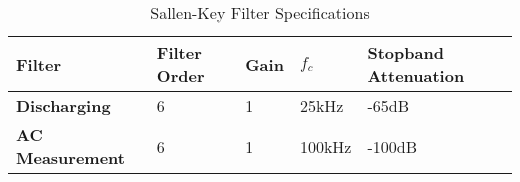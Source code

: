 \begin{table}[ht!]
\centering
\begin{tabular}{|l|l|l|l|l|}
\hline
{\bf Filter}         & {\bf Filter Order} & {\bf Gain} & {\bf $f_c$} & {\bf Stopband Attenuation} \\ \hline
{\bf Discharging}    & 6                  & 1          & 25kHz      & -65dB                      \\ \hline
{\bf AC Measurement} & 6                  & 1          & 100kHz     & -100dB                     \\ \hline
\end{tabular}
\caption{Sallen-Key Filter Specifications}
\label{table:skey}
\end{table}

